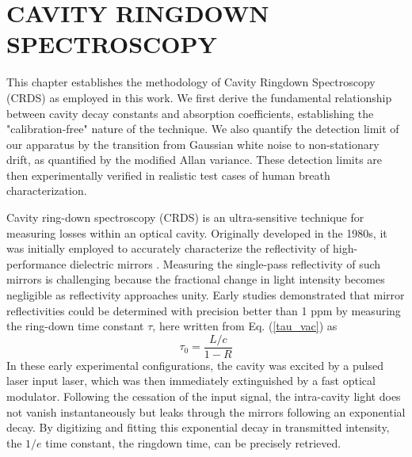 \documentclass[8pt,a4paper]{report}
\begin{document}
	\chapter{CAVITY RINGDOWN SPECTROSCOPY} \label{chap:CRDS}
	
	This chapter establishes the methodology of Cavity Ringdown Spectroscopy (CRDS) as employed in this work. We first derive the fundamental relationship between cavity decay constants and absorption coefficients, establishing the "calibration-free" nature of the technique. We also quantify the detection limit of our apparatus by the transition from Gaussian white noise to non-stationary drift, as quantified by the modified Allan variance. These detection limits are then experimentally verified in realistic test cases of human breath characterization.
		
	Cavity ring-down spectroscopy (CRDS) is an ultra-sensitive technique for measuring losses within an optical cavity. Originally developed in the 1980s, it was initially employed to accurately characterize the reflectivity of high-performance dielectric mirrors \cite{book_crds}. Measuring the single-pass reflectivity of such mirrors is challenging because the fractional change in light intensity becomes negligible as reflectivity approaches unity. Early studies \cite{crds_mirror_R_Herbelin, crds_mirror_R_Anderson} demonstrated that mirror reflectivities could be determined with precision better than 1 ppm by measuring the ring-down time constant $\tau$, here written from Eq. (\ref{tau_vac}) as
	\begin{equation} \label{crds_tau_vac}
		\tau_0 = \frac{L/c}{1-R}
	\end{equation}
	In these early experimental configurations, the cavity was excited by a pulsed laser input laser, which was then immediately extinguished by a fast optical modulator. Following the cessation of the input signal, the intra-cavity light does not vanish instantaneously but leaks through the mirrors following an exponential decay. By digitizing and fitting this exponential decay in transmitted intensity, the $1/e$ time constant, the ringdown time, can be precisely retrieved.
	
\end{document}

